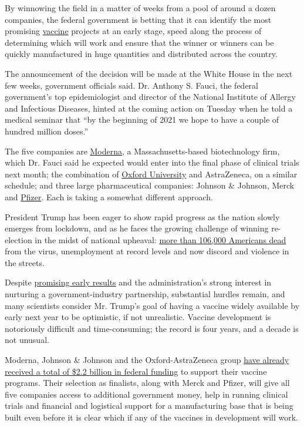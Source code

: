 By winnowing the field in a matter of weeks from a pool of around a
dozen companies, the federal government is betting that it can identify
the most promising
\href{https://www.nytimes.com/interactive/2020/06/09/magazine/covid-vaccine.html}{vaccine}
projects at an early stage, speed along the process of determining which
will work and ensure that the winner or winners can be quickly
manufactured in huge quantities and distributed across the country.

The announcement of the decision will be made at the White House in the
next few weeks, government officials said. Dr. Anthony S. Fauci, the
federal government's top epidemiologist and director of the National
Institute of Allergy and Infectious Diseases, hinted at the coming
action on Tuesday when he told a medical seminar that ``by the beginning
of 2021 we hope to have a couple of hundred million doses.''

The five companies are
\href{https://www.nytimes.com/2020/07/27/health/moderna-vaccine-covid.html}{Moderna},
a Massachusetts-based biotechnology firm, which Dr. Fauci said he
expected would enter into the final phase of clinical trials next month;
the combination of
\href{https://www.nytimes.com/2020/04/27/world/europe/coronavirus-vaccine-update-oxford.html}{Oxford
University} and AstraZeneca, on a similar schedule; and three large
pharmaceutical companies: Johnson \& Johnson, Merck and
\href{https://www.nytimes.com/2020/07/27/health/moderna-vaccine-covid.html}{Pfizer}.
Each is taking a somewhat different approach.

President Trump has been eager to show rapid progress as the nation
slowly emerges from lockdown, and as he faces the growing challenge of
winning re-election in the midst of national upheaval:
\href{https://www.nytimes.com/interactive/2020/us/coronavirus-us-cases.html}{more
than 106,000 Americans dead} from the virus, unemployment at record
levels and now discord and violence in the streets.

Despite
\href{https://www.nytimes.com/2020/05/20/health/coronavirus-vaccines.html}{promising
early results} and the administration's strong interest in nurturing a
government-industry partnership, substantial hurdles remain, and many
scientists consider Mr. Trump's goal of having a vaccine widely
available by early next year to be optimistic, if not unrealistic.
Vaccine development is notoriously difficult and time-consuming; the
record is four years, and a decade is not unusual.

Moderna, Johnson \& Johnson and the Oxford-AstraZeneca group
\href{https://www.nytimes.com/2020/05/21/health/coronavirus-vaccine-astrazeneca.html}{have
already received a total of \$2.2 billion in federal funding} to support
their vaccine programs. Their selection as finalists, along with Merck
and Pfizer, will give all five companies access to additional government
money, help in running clinical trials and financial and logistical
support for a manufacturing base that is being built even before it is
clear which if any of the vaccines in development will work.

